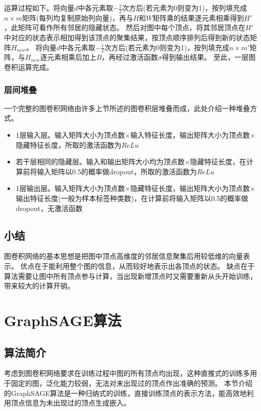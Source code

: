 运算过程如下。将向量$d$中各元素取$-\frac{1}{2}$次方后(若元素为0则变为1)，按列填充成$n\times m$矩阵(每列均复制原始列向量)，再与$H$和$W$矩阵乘的结果逐元素相乘得到$H'$，此矩阵可看作所有邻居的隐藏状态。
然后对图中每个顶点，将其邻居顶点在$H'$中对应的状态表示相加得到该顶点的聚集结果，按顶点顺序排列后得到新的状态矩阵$H_{new}$。
将向量$d$中各元素取$-\frac{1}{2}$次方后(若元素为0则变为1)，按列填充成$n\times m'$矩阵，与$H_{new}$逐元素相乘后加上$B$，再经过激活函数$\sigma$得到输出结果。
至此，一层图卷积运算完成。

\subsubsection{层间堆叠}
一个完整的图卷积网络由许多上节所述的图卷积层堆叠而成，此处介绍一种堆叠方式。

\begin{itemize}
    \item 1层输入层。输入矩阵大小为顶点数$\times$输入特征长度，输出矩阵大小为顶点数$\times$隐藏特征长度，所取的激活函数为$ReLu$
    \item 若干层相同的隐藏层。输入和输出矩阵大小均为顶点数$\times$隐藏特征长度，在计算前将输入矩阵以0.5的概率做dropout，所取的激活函数为$ReLu$
    \item 1层输出层。输入矩阵大小为顶点数$\times$隐藏特征长度，输出矩阵大小为顶点数$\times$输出特征长度(一般为样本标签种类数)，在计算前将输入矩阵以0.5的概率做dropout，无激活函数
\end{itemize}

\subsection{小结}
图卷积网络的基本思想是把图中顶点高维度的邻居信息聚集后用较低维的向量表示。
优点在于能利用整个图的信息，从而较好地表示出各顶点的状态。
缺点在于算法需要让图中所有顶点参与计算，当出现新增顶点时又需要重新从头开始训练，带来较大的计算开销。

\section{GraphSAGE算法}

\subsection{算法简介}
考虑到图卷积网络要求在训练过程中图的所有顶点均出现，这种直推式的训练多用于固定的图，泛化能力较弱，无法对未出现过的顶点作出准确的预测。
本节介绍的GraphSAGE算法\cite{graphsage}是一种归纳式的训练，直接训练顶点的表示方法，能高效地利用顶点信息为未出现过的顶点生成嵌入。

